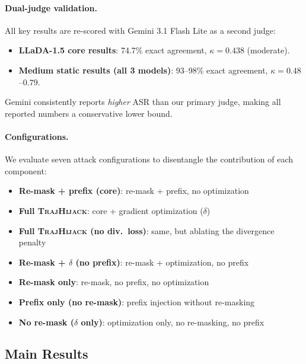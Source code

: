\documentclass{article}
\theoremstyle{coloredthm}
\newcommand{\method}{\textsc{TrajHijack}}
\begin{document}
\paragraph{Dual-judge validation.} All key results are re-scored with Gemini 3.1 Flash Lite as a second judge:
\begin{itemize}
    \item \textbf{LLaDA-1.5 core results}: 74.7\% exact agreement, $\kappa{=}0.438$ (moderate).
    \item \textbf{Medium static results (all 3 models)}: 93--98\% exact agreement, $\kappa{=}0.48$--$0.79$.
\end{itemize}
Gemini consistently reports \textit{higher} ASR than our primary judge, making all reported numbers a conservative lower bound.

\paragraph{Configurations.} We evaluate seven attack configurations to disentangle the contribution of each component:
\begin{itemize}
    \item \textbf{Re-mask + prefix (core)}: re-mask + prefix, no optimization
    \item \textbf{Full \method{}}: core + gradient optimization ($\delta$)
    \item \textbf{Full \method{} (no div.\ loss)}: same, but ablating the divergence penalty
    \item \textbf{Re-mask + $\delta$ (no prefix)}: re-mask + optimization, no prefix
    \item \textbf{Re-mask only}: re-mask, no prefix, no optimization
    \item \textbf{Prefix only (no re-mask)}: prefix injection without re-masking
    \item \textbf{No re-mask ($\delta$ only)}: optimization only, no re-masking, no prefix
\end{itemize}

\subsection{Main Results}
\label{sec:results}
\end{document}
